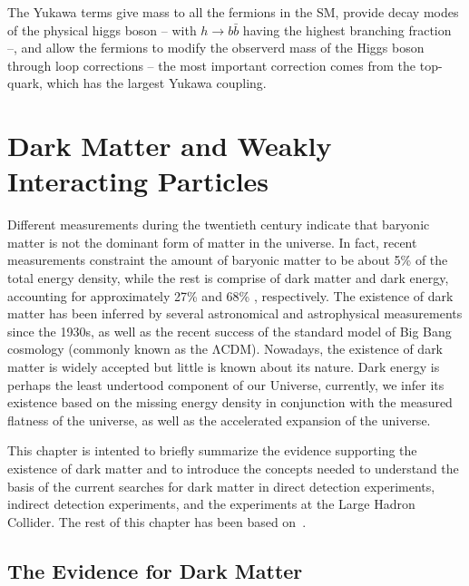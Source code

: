The Yukawa terms give mass to all the fermions in the SM, provide decay modes of the physical higgs boson -- with
$h\rightarrow b\bar{b}$ having the highest branching fraction --, and
allow the fermions to modify the observerd mass of the Higgs boson through
loop corrections -- the most important correction comes from the
top-quark, which has the largest Yukawa coupling.

\chapter{Dark Matter and Weakly Interacting Particles}
Different measurements during the twentieth century indicate that
baryonic matter is not the dominant form of matter in the
universe. In fact, recent measurements constraint the amount of baryonic matter
to be about 5\% of the total energy density, while the rest is
comprise of dark matter and dark energy, accounting for approximately 27\%  and 68\% ,
respectively. The existence of dark matter has been inferred by
several astronomical and astrophysical measurements since the 1930s,
as well as the recent success of the standard model of Big Bang
cosmology (commonly known as the $\mathrm{\Lambda CDM}$). Nowadays,
the existence of dark matter is widely accepted but little is known
about its nature. Dark energy is perhaps the least undertood component
of our Universe, currently, we infer its existence based on the
missing energy density in conjunction with the measured flatness of
the universe, as well as the accelerated expansion of the universe.

This chapter is intented to briefly summarize the evidence supporting
the existence of dark matter and to introduce the concepts needed to
understand the basis of the current searches for dark matter in direct
detection experiments, indirect detection experiments, and the
experiments at the Large Hadron Collider. The rest of this chapter has
been based on~\cite{Golwala,DM_Primer}.

\section{The Evidence for Dark Matter}
